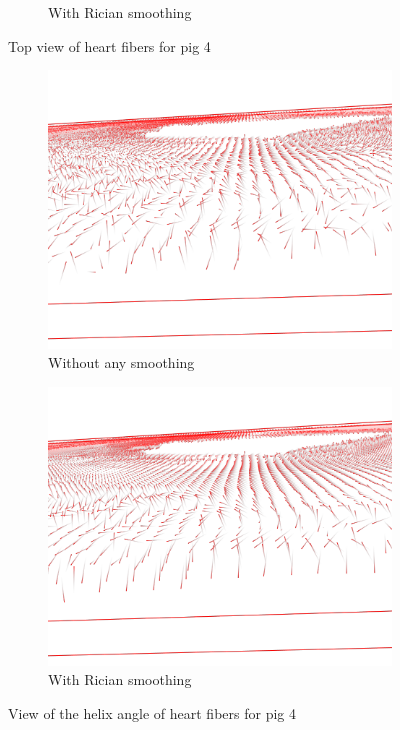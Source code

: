 \begin{figure}[!h]
\begin{subfigure}{.48\textwidth}
        \caption{With Rician smoothing}
        \label{fig:pig4_topview_smooth}
    \end{subfigure}
    \caption{Top view of heart fibers for pig 4}
    \label{fig:pig4_topviews}
    \begin{subfigure}{.48\textwidth}
        \includegraphics[width=\textwidth]{figures/pig4_helix_no_smooth}
        \caption{Without any smoothing}
        \label{fig:pig4_helix_no_smooth}
    \end{subfigure}
    \begin{subfigure}{.48\textwidth}
        \includegraphics[width=\textwidth]{figures/pig4_helix_smooth}
        \caption{With Rician smoothing}
        \label{fig:pig4_helix_smooth}
    \end{subfigure}
    \caption{View of the helix angle of heart fibers for pig 4}
    \label{fig:pig4_helix}
\end{figure}

